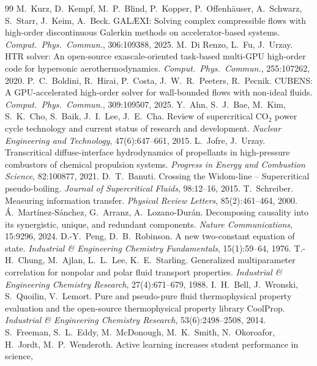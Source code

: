 \documentclass[11pt]{article}
\begin{document}
\begin{thebibliography}{99}
 M.\ Kurz, D.\ Kempf, M.\ P.\ Blind, P.\ Kopper, P.\ Offenh\"auser, A.\ Schwarz, S.\ Starr, J.\ Keim, A.\ Beck. GAL\AE XI: Solving complex compressible flows with high-order discontinuous Galerkin methods on accelerator-based systems. \emph{Comput.\ Phys.\ Commun.}, 306:109388, 2025.
 M.\ Di Renzo, L.\ Fu, J.\ Urzay. HTR solver: An open-source exascale-oriented task-based multi-GPU high-order code for hypersonic aerothermodynamics. \emph{Comput.\ Phys.\ Commun.}, 255:107262, 2020.
 P.\ C.\ Boldini, R.\ Hirai, P.\ Costa, J.\ W.\ R.\ Peeters, R.\ Pecnik. CUBENS: A GPU-accelerated high-order solver for wall-bounded flows with non-ideal fluids. \emph{Comput.\ Phys.\ Commun.}, 309:109507, 2025.
 Y.\ Ahn, S.\ J.\ Bae, M.\ Kim, S.\ K.\ Cho, S.\ Baik, J.\ I.\ Lee, J.\ E.\ Cha.
Review of supercritical CO$_2$ power cycle technology and current status of research and
development. \emph{Nuclear Engineering and Technology}, 47(6):647--661, 2015.
 L.\ Jofre, J.\ Urzay. Transcritical diffuse-interface hydrodynamics
of propellants in high-pressure combustors of chemical propulsion systems. \emph{Progress
in Energy and Combustion Science}, 82:100877, 2021.
 D.\ T.\ Banuti. Crossing the Widom-line -- Supercritical pseudo-boiling.
\emph{Journal of Supercritical Fluids}, 98:12--16, 2015.
 T.\ Schreiber. Measuring information transfer. \emph{Physical Review
Letters}, 85(2):461--464, 2000.
 \'A.\ Mart\'inez-S\'anchez, G.\ Arranz, A.\ Lozano-Dur\'an.
Decomposing causality into its synergistic, unique, and redundant components. \emph{Nature
Communications}, 15:9296, 2024.
 D.-Y.\ Peng, D.\ B.\ Robinson. A new two-constant equation of
state. \emph{Industrial \& Engineering Chemistry Fundamentals}, 15(1):59--64, 1976.
 T.-H.\ Chung, M.\ Ajlan, L.\ L.\ Lee, K.\ E.\ Starling. Generalized
multiparameter correlation for nonpolar and polar fluid transport properties.
\emph{Industrial \& Engineering Chemistry Research}, 27(4):671--679, 1988.
 I.\ H.\ Bell, J.\ Wronski, S.\ Quoilin, V.\ Lemort. Pure and
pseudo-pure fluid thermophysical property evaluation and the open-source thermophysical
property library CoolProp. \emph{Industrial \& Engineering Chemistry Research},
53(6):2498--2508, 2014.
 S.\ Freeman, S.\ L.\ Eddy, M.\ McDonough, M.\ K.\ Smith, N.\ Okoroafor,
H.\ Jordt, M.\ P.\ Wenderoth. Active learning increases student performance in science,

\end{thebibliography}
\end{document}
